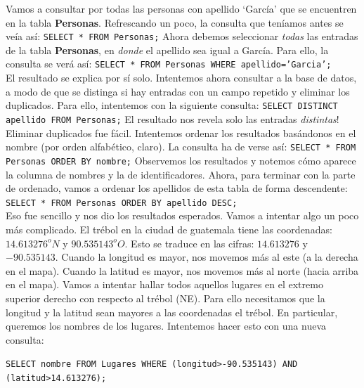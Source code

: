 \documentclass[10pt,letterpaper]{article}
\newcommand{\inlinecode}[1]{
\colorbox{light-gray}{\texttt{#1}}
}
\begin{document}
Vamos a consultar por todas las personas con apellido `Garc\'ia' que se encuentren en la tabla \textbf{Personas}. Refrescando un poco, la consulta que ten\'iamos antes se ve\'ia as\'i: \inlinecode{SELECT * FROM Personas;} Ahora debemos seleccionar \emph{todas} las entradas de la tabla \textbf{Personas}, en \emph{donde} el apellido sea igual a Garc\'ia. Para ello, la consulta se ver\'a as\'i: \inlinecode{SELECT * FROM Personas WHERE apellido='Garcia';}\\

El resultado se explica por s\'i solo. Intentemos ahora consultar a la base de datos, a modo de que se distinga si hay entradas con un campo repetido y eliminar los duplicados. Para ello, intentemos con la siguiente consulta: \inlinecode{SELECT DISTINCT apellido FROM Personas;} El resultado nos revela solo las entradas \emph{distintas}! Eliminar duplicados fue f\'acil. Intentemos ordenar los resultados bas\'andonos en el nombre (por orden alfab\'etico, claro). La consulta ha de verse as\'i: \inlinecode{SELECT * FROM Personas ORDER BY nombre;} Observemos los resultados y notemos c\'omo aparece la columna de nombres y la de identificadores. Ahora, para terminar con la parte de ordenado, vamos a ordenar los apellidos de esta tabla de forma descendente: \inlinecode{SELECT * FROM Personas ORDER BY apellido DESC;}\\

Eso fue sencillo y nos dio los resultados esperados. Vamos a intentar algo un poco m\'as complicado. El tr\'ebol en la ciudad de guatemala tiene las coordenadas: $14.613276^o N$ y $90.535143^o O$. Esto se traduce en las cifras: $14.613276$ y $-90.535143$. Cuando la longitud es mayor, nos movemos m\'as al este (a la derecha en el mapa). Cuando la latitud es mayor, nos movemos m\'as al norte (hacia arriba en el mapa). Vamos a intentar hallar todos aquellos lugares en el extremo superior derecho con respecto al tr\'ebol (NE). Para ello necesitamos que la longitud y la latitud sean mayores a las coordenadas el tr\'ebol. En particular, queremos los nombres de los lugares. Intentemos hacer esto con una nueva consulta:
\inlinecode{SELECT nombre FROM Lugares WHERE (longitud>-90.535143) AND (latitud>14.613276);}\\
\end{document}
